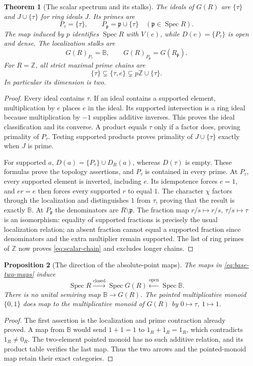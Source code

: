 \documentclass[11pt,a4paper]{article}
\newtheorem{theorem}{Theorem}[section]
\newtheorem{proposition}[theorem]{Proposition}
\theoremstyle{definition}\newtheorem{definition}[theorem]{Definition}
\newcommand{\Z}{\mathbb Z}\newcommand{\Q}{\mathbb Q}
\newcommand{\B}{\mathbb B}\newcommand{\N}{\mathbb N}
\newcommand{\Spec}{\operatorname{Spec}}\newcommand{\SpecMon}{\operatorname{Spec}_{\mathrm{mon}}}
\begin{document}
\begin{theorem}[The scalar spectrum and its stalks]\label{thm:rebuilt-scalar}
The ideals of $G(R)$ are $\{\tau\}$ and $J\cup\{\tau\}$ for ring ideals $J$. Its primes are
\[
 P_\tau=\{\tau\},\qquad P_{\mathfrak p}=\mathfrak p\cup\{\tau\}\quad(\mathfrak p\in\Spec R).
\]
The map induced by $p$ identifies $\Spec R$ with $V(e)$, while $D(e)=\{P_\tau\}$ is open and dense. The localization stalks are
\[
 G(R)_{P_\tau}=\B,\qquad G(R)_{P_{\mathfrak p}}=G(R_{\mathfrak p}).
\]
For $R=\Z$, all strict maximal prime chains are
\begin{equation}\label{eq:scalar-chain}
 \{\tau\}\subsetneq\{\tau,e\}\subsetneq p\Z\cup\{\tau\}.
\end{equation}
In particular its dimension is two.
\end{theorem}
\begin{proof}
Every ideal contains $\tau$. If an ideal contains a supported element, multiplication by $e$ places $e$ in the ideal. Its supported intersection is a ring ideal because multiplication by $-1$ supplies additive inverses. This proves the ideal classification and its converse. A product equals $\tau$ only if a factor does, proving primality of $P_\tau$. Testing supported products proves primality of $J\cup\{\tau\}$ exactly when $J$ is prime.

For supported $a$, $D(a)=\{P_\tau\}\cup D_R(a)$, whereas $D(\tau)$ is empty. These formulas prove the topology assertions, and $P_\tau$ is contained in every prime. At $P_\tau$, every supported element is inverted, including $e$. Its idempotence forces $e=1$, and $er=e$ then forces every supported $r$ to equal $1$. The character $\chi$ factors through the localization and distinguishes $1$ from $\tau$, proving that the result is exactly $\B$. At $P_{\mathfrak p}$ the denominators are $R\setminus\mathfrak p$. The fraction map $r/s\mapsto r/s$, $\tau/s\mapsto\tau$ is an isomorphism: equality of supported fractions is precisely the usual localization relation; an absent fraction cannot equal a supported fraction since denominators and the extra multiplier remain supported. The list of ring primes of $\Z$ now proves \eqref{eq:scalar-chain} and excludes longer chains.
\end{proof}

\begin{proposition}[The direction of the absolute-point maps]\label{prop:base-arrows}
The maps in \eqref{eq:base-two-maps} induce
\[
 \Spec R\xrightarrow{\text{closed}}\Spec G(R)
 \xleftarrow{\text{open}}\Spec\B.
\]
There is no unital semiring map $\B\to G(R)$. The pointed multiplicative monoid $\{0,1\}$ does map to the multiplicative monoid of $G(R)$ by $0\mapsto\tau$, $1\mapsto1$.
\end{proposition}
\begin{proof}
The first assertion is the localization and prime contraction already proved. A map from $\B$ would send $1+1=1$ to $1_R+1_R=1_R$, which contradicts $1_R\ne0_R$. The two-element pointed monoid has no such additive relation, and its product table verifies the last map. Thus the two arrows and the pointed-monoid map retain their exact categories.
\end{proof}
\end{document}
